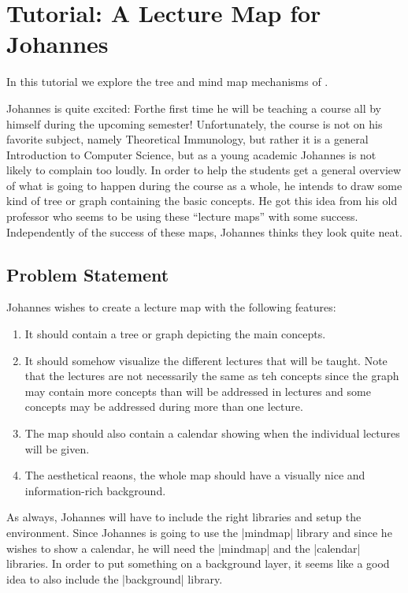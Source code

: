 %
%
%

\section{Tutorial: A Lecture Map for Johannes}

In this tutorial we explore the tree and mind map mechanisms of
\tikzname.

Johannes is quite excited: Forthe first time he will be teaching a
course all by himself during the upcoming semester! Unfortunately, the
course is not on his favorite subject, namely Theoretical Immunology,
but rather it is a general Introduction to Computer Science, but as a
young academic Johannes is not likely to complain too loudly.
In order to help the students get a general overview of what is
going to happen during the course as a whole, he intends to draw some
kind of tree or graph containing the basic concepts. He got this idea
from his old professor who seems to be using these ``lecture maps''
with some success. Independently of the success of these maps,
Johannes thinks they look quite neat.


\subsection{Problem Statement}

Johannes wishes to create a lecture map with the following features:
\begin{enumerate}
\item It should contain a tree or graph depicting the main concepts.
\item It should somehow visualize the different lectures that will be
  taught. Note that the lectures are not necessarily the same as teh
  concepts since the graph may contain more concepts than will be
  addressed in lectures and some concepts may be addressed during more
  than one lecture.
\item The map should also contain a calendar showing when the
  individual lectures will be given.
\item The aesthetical reaons, the whole map should have a  visually
  nice and information-rich background.
\end{enumerate}

As always, Johannes will have to include the right libraries and
setup the environment. Since Johannes is going to use the
|mindmap| library and since he wishes to show a calendar, he will need
the |mindmap| and the |calendar| libraries. In order to put something
on a background layer, it seems like a good idea to also include the
|background| library.


